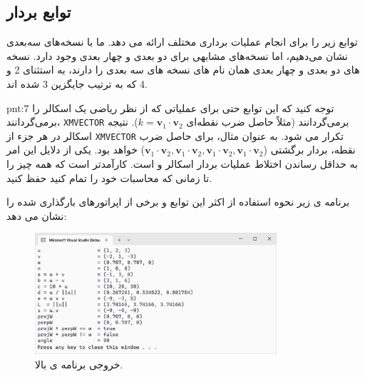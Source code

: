 \subsection{\textbf{توابع بردار}}
{
    \Large
    \begin{spacing}{1.5}
         توابع زیر را برای انجام عملیات برداری مختلف ارائه می دهد.
        ما با نسخه‌های سه‌بعدی نشان می‌دهیم، اما نسخه‌های مشابهی برای دو بعدی و چهار بعدی وجود دارد.
        نسخه های دو بعدی و چهار بعدی همان نام های نسخه های سه بعدی را دارند، به استثنای 2 و 4 که به ترتیب جایگزین 3 شده اند.
        \textbf{\vspace{6pt}}
        \lr{}
        \textbf{\vspace{-20pt}}
        \begin{point}{pnt:7}
            \Large
            توجه کنید که این توابع حتی برای عملیاتی که از نظر ریاضی یک اسکالر را برمی‌گردانند، \texttt{XMVECTOR} برمی‌گردانند (مثلاً حاصل ضرب نقطه‌ای $k=\textbf{v}_{1}\cdot\textbf{v}_{2}$).
            نتیجه اسکالر در هر جزء از \texttt{XMVECTOR} تکرار می شود. به عنوان مثال، برای حاصل ضرب نقطه، بردار برگشتی ($\textbf{v}_{1}\cdot\textbf{v}_{2},\textbf{v}_{1}\cdot\textbf{v}_{2},\textbf{v}_{1}\cdot\textbf{v}_{2},\textbf{v}_{1}\cdot\textbf{v}_{2}$) خواهد بود.
            یکی از دلایل این امر به حداقل رساندن اختلاط عملیات بردار اسکالر و  است.
            کارآمدتر است که همه چیز  را تا زمانی که محاسبات خود را تمام کنید حفظ کنید.
        \end{point}
        \textbf{\vspace{6pt}}
        برنامه ی زیر نحوه استفاده از اکثر این توابع و برخی از اپراتورهای بارگذاری شده را نشان می دهد:
        \textbf{\vspace{6pt}}
        \lr{}
        \textbf{\vspace{-30pt}}
        \begin{figure}[H]
            \centering
            \setlength{\belowcaptionskip}{-10pt}
            \includegraphics[width=0.8\textwidth]{Images/4/4.Session.1.1.19}
            \caption {خروجی برنامه ی بالا.}
            \label{fig:4.Session.1.1.19}
        \end{figure}
        \textbf{\vspace{-30pt}}


\end{spacing}}
